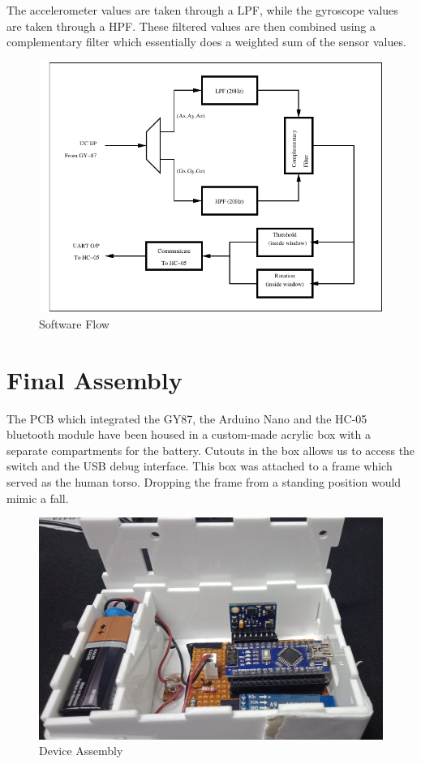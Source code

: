 \documentclass[11pt, a4paper]{article}
\begin{document}
\noindent The accelerometer values are taken through a LPF, while the
gyroscope values are taken through a HPF. These filtered values are then
combined using a complementary filter which essentially does a weighted sum of the sensor values.
\begin{figure}[htb]
    \centering
    \includegraphics[width=\linewidth]{SW_Flow.pdf}
    \caption{Software Flow}
    \label{fig:sw_flow}
\end{figure}

\section{Final Assembly}
The PCB which integrated the GY87, the Arduino Nano and the HC-05 bluetooth module have been housed in a custom-made acrylic box with a separate compartments for the battery. Cutouts in the box allows us to access the switch and the USB debug interface. This box was attached to a frame which served as the human torso. Dropping the frame from a standing position would mimic a fall.

\begin{figure}
    \centering
    \includegraphics[width=\linewidth]{Box.png}
    \caption{Device Assembly}
    \label{fig:box}
\end{figure}
\end{document}
